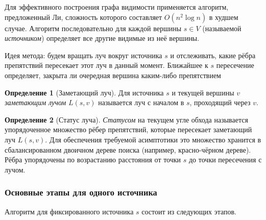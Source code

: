 \documentclass[intlimits,twoside,a4paper,11pt]{article}
\theoremstyle{definition}
\newtheorem{definition}{Определение}[section]
\begin{document}
Для эффективного построения графа видимости применяется алгоритм, предложенный Ли,
сложность которого составляет $O(n^2 \log n)$ в худшем случае.
Алгоритм последовательно для каждой вершины $s \in V$ (называемой \emph{источником}) определяет все другие видимые из неё вершины.

Идея метода: будем вращать луч вокруг источника $s$ и отслеживать, какие рёбра препятствий пересекает этот луч в данный момент. 
Ближайшее к $s$ пересечение определяет, закрыта ли очередная вершина каким-либо препятствием

\begin{definition}[Заметающий луч]\label{def:processing_ray}
Для источника $s$ и текущей вершины $v$ \textit{заметающим лучом} $L(s, v)$ называется луч с началом в $s$, проходящий через $v$.
\end{definition}

\begin{definition}[Статус луча]\label{def:ray_status}
\textit{Статусом} на текущем угле обхода называется упорядоченное множество рёбер препятствий, которые пересекает заметающий луч $L(s, v)$. 
Для обеспечения требуемой асимптотики это множество хранится в сбалансированном двоичном дереве поиска 
(например, красно-чёрном дереве). Рёбра упорядочены по возрастанию расстояния от точки $s$ до точки пересечения с лучом.
\end{definition}

\subsubsection{Основные этапы для одного источника}

Алгоритм для фиксированного источника $s$ состоит из следующих этапов.
\end{document}
